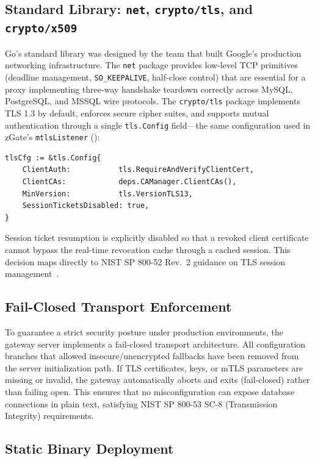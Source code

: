 \subsection{Standard Library: \texttt{net}, \texttt{crypto/tls}, and \texttt{crypto/x509}}

Go's standard library was designed by the team that built Google's production networking infrastructure. The \texttt{net} package provides low-level TCP primitives (deadline management, \texttt{SO\_KEEPALIVE}, half-close control) that are essential for a proxy implementing three-way handshake teardown correctly across MySQL, PostgreSQL, and MSSQL wire protocols. The \texttt{crypto/tls} package implements TLS 1.3 by default, enforces secure cipher suites, and supports mutual authentication through a single \texttt{tls.Config} field---the same configuration used in zGate's \texttt{mtlsListener} ():

\begin{verbatim}
tlsCfg := &tls.Config{
    ClientAuth:           tls.RequireAndVerifyClientCert,
    ClientCAs:            deps.CAManager.ClientCAs(),
    MinVersion:           tls.VersionTLS13,
    SessionTicketsDisabled: true,
}
\end{verbatim}

Session ticket resumption is explicitly disabled so that a revoked client certificate cannot bypass the real-time revocation cache through a cached session. This decision maps directly to NIST SP 800-52 Rev.\ 2 guidance on TLS session management~\cite{nist-tls}.

\subsection{Fail-Closed Transport Enforcement}

To guarantee a strict security posture under production environments, the gateway server implements a fail-closed transport architecture. All configuration branches that allowed insecure/unencrypted fallbacks have been removed from the server initialization path. If TLS certificates, keys, or mTLS parameters are missing or invalid, the gateway automatically aborts and exits (fail-closed) rather than failing open. This ensures that no misconfiguration can expose database connections in plain text, satisfying NIST SP 800-53 SC-8 (Transmission Integrity) requirements.

\subsection{Static Binary Deployment}


